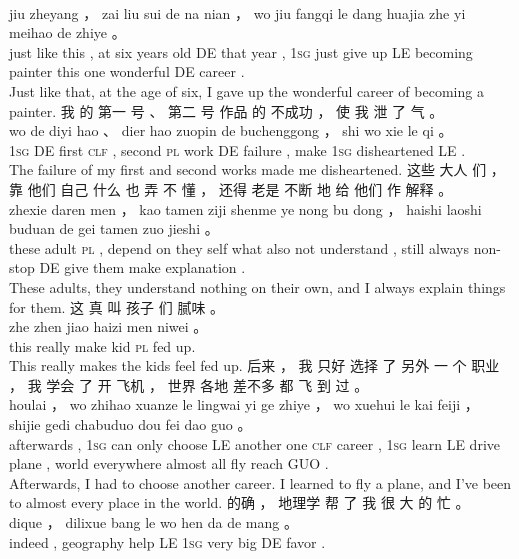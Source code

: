 \documentclass[UTF8]{ctexart}
\begin{document}
\begin{exe}
\\
jiu zheyang ， zai liu sui de na nian ， wo jiu fangqi le dang huajia zhe yi meihao de zhiye 。
\\
just {like this} , at six {years old} DE that year , \textsc{1sg} just {give up} LE becoming painter this one wonderful DE career .
\\
\trans Just like that, at the age of six, I gave up the wonderful career of becoming a painter.
\ex
\glll
我 的 第一 号 、 第二 号 作品 的 不成功 ， 使 我 泄 了 气 。
\\
wo de diyi hao 、 dier hao zuopin de buchenggong ， shi wo xie le qi 。
\\
\textsc{1sg} DE first \textsc{clf} , second \textsc{pl} work DE failure , make \textsc{1sg} disheartened LE {} .
\\
\trans The failure of my first and second works made me disheartened.
\ex
\glll
这些 大人 们 ， 靠 他们 自己 什么 也 弄 不 懂 ， 还得 老是 不断 地 给 他们 作 解释 。
\\
zhexie daren men ， kao tamen ziji shenme ye nong bu dong ， haishi laoshi buduan de gei tamen zuo jieshi 。
\\
these adult \textsc{pl} , {depend on} they self what also {} not understand , still always {non-stop} DE give them make explanation .
\\
\trans These adults, they understand nothing on their own, and I always explain things for them. 
\ex
\glll
这 真 叫 孩子 们 腻味 。
\\
zhe zhen jiao haizi men niwei 。
\\
this really make kid \textsc{pl} {fed up}.
\\
\trans This really makes the kids feel fed up. 
\ex
\glll
后来 ， 我 只好 选择 了 另外 一 个 职业 ， 我 学会 了 开 飞机 ， 世界 各地 差不多 都 飞 到 过 。
\\
houlai ， wo zhihao xuanze le lingwai yi ge zhiye ， wo xuehui le kai feiji ， shijie gedi chabuduo dou fei dao guo 。
\\
afterwards , \textsc{1sg} {can only} choose LE another one \textsc{clf} career , \textsc{1sg} learn LE drive plane , world everywhere almost all fly reach GUO .
\\
\trans Afterwards, I had to choose another career. I learned to fly a plane, and I've been to almost every place in the world. 
\ex
\glll
的确 ， 地理学 帮 了 我 很 大 的 忙 。
\\
dique ， dilixue bang le wo hen da de mang 。
\\
indeed , geography help LE \textsc{1sg} very big DE favor .

\end{exe}
\end{document}
